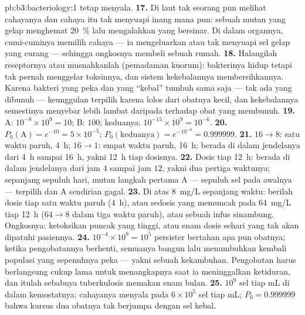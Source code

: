 \begin{solution}{pb:b3:bacteriology:1}
tetap menyala.
\textbf{17.} Di laut tak seorang pun melihat cahayanya dan cahaya itu tak
menyuapi inang mana pun: sebuah mutan yang gelap menghemat \qty{20}{\%} lalu
mengalahkan yang bersinar. Di dalam organnya, cumi-cuminya memilih cahaya ---
ia mengeluarkan atau tak menyuapi sel gelap yang curang --- sehingga ongkosnya
membeli sebuah rumah.
\textbf{18.} Halangilah reseptornya atau musnahkanlah 
(pemadaman kuorum): bakterinya hidup tetapi tak pernah menggelar toksinnya, dan
sistem kekebalannya membersihkannya. Karena bakteri yang peka dan yang
``kebal'' tumbuh sama saja --- tak ada yang dibunuh --- keunggulan terpilih
karena lolos dari obatnya kecil, dan kekebalannya semestinya menyebar lebih
lambat daripada terhadap obat yang membunuh.
\textbf{19.} A: $10^{-8}\times 10^{9} = 10$; B: $100$; keduanya: $10^{-15}\times
10^{9} = 10^{-6}$.
\textbf{20.} $P_{0}(\text{A}) = e^{-10} = 5\times 10^{-5}$;
$P_{0}(\text{keduanya}) = e^{-10^{-6}} = 0.999999$.
\textbf{21.} $16 \to 8$: satu waktu paruh, \qty{4}{h}; $16 \to 1$: empat waktu
paruh, \qty{16}{h}; berada di dalam jendelanya dari \qty{4}{h} sampai
\qty{16}{h}, yakni \qty{12}{h} tiap dosisnya.
\textbf{22.} Dosis tiap \qty{12}{h}: berada di dalam jendelanya dari jam $4$
sampai jam $12$, yakni dua pertiga waktunya; sepanjang sepuluh hari, mutan
langkah pertama A --- sepuluh sel pada awalnya --- terpilih dan A sendirian
gagal.
\textbf{23.} Di atas \qty{8}{mg/L} sepanjang waktu: berilah dosis tiap satu
waktu paruh (\qty{4}{h}), atau sedosis yang memuncak pada \qty{64}{mg/L} tiap
\qty{12}{h} ($64 \to 8$ dalam tiga waktu paruh), atau sebuah infus sinambung.
Ongkosnya: ketoksikan puncak yang tinggi, atau enam dosis sehari yang tak akan
dipatuhi pasiennya.
\textbf{24.} $10^{-4}\times 10^{9} = 10^{5}$ persister bertahan apa pun
obatnya; ketika pengobatannya berhenti, semuanya bangun lalu menumbuhkan
kembali populasi yang sepenuhnya peka --- yakni sebuah kekambuhan. Pengobatan
harus berlangsung cukup lama untuk menangkapnya saat ia meninggalkan
ketiduran, dan itulah sebabnya tuberkulosis memakan enam bulan.
\textbf{25.} $10^{9}$ sel tiap mL di dalam kemostatnya; cahayanya menyala pada
$6\times 10^{5}$ sel tiap mL; $P_{0} = 0.999999$ bahwa kursus dua obatnya
tak berjumpa dengan sel kebal.
\end{solution}

